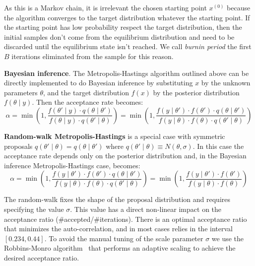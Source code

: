 \documentclass[11pt,fleqn]{book} %
\begin{document}
As this is a Markov chain, it is irrelevant the chosen starting point 
$x^{(0)}$ because the algorithm converges to the target distribution
whatever the starting point. If the starting point has low probability 
respect the target distribution, then the initial samples don't come 
from the equilibrium distribution and need to be discarded until the 
equilibrium state isn't reached. We call \emph{burnin period} the first 
$B$ iterations eliminated from the sample for this reason.

\textbf{Bayesian inference}.
The Metropolis-Hastings algorithm outlined above can be directly implemented 
to do Bayesian inference by substituting $x$ by the unknown parameters 
$\theta$, and the target distribution $f(x)$ by the posterior distribution 
$f(\theta \mid y)$. Then the acceptance rate becomes:
\begin{displaymath}
	\alpha = \min\left(1,\frac{f(\theta' \mid y) \cdot q(\theta \mid \theta')}{f(\theta \mid y) \cdot q(\theta' \mid \theta)}\right) = \min\left(1,\frac{f(y \mid \theta') \cdot f(\theta') \cdot q(\theta \mid \theta')}{f(y \mid \theta)  \cdot f(\theta) \cdot q(\theta' \mid \theta)}\right)
\end{displaymath}

\textbf{Random-walk Metropolis-Hastings} is a special case with symmetric 
proposals $q(\theta' \mid \theta) = q(\theta \mid \theta')$ where 
$q(\theta' \mid \theta) \equiv N(\theta,\sigma)$. 
In this case the acceptance rate depends only on the posterior distribution
and, in the Bayesian inference Metropolis-Hastings case, becomes:
\begin{displaymath}
	\alpha = 
	\min\left(1,\frac{f(y \mid \theta') \cdot f(\theta') \cdot q(\theta \mid \theta')}{f(y \mid \theta)  \cdot f(\theta) \cdot q(\theta' \mid \theta)}\right) = 
	\min\left(1,\frac{f(y \mid \theta') \cdot f(\theta')}{f(y \mid \theta) \cdot f(\theta)}\right)
\end{displaymath}

The random-walk fixes the shape of the proposal distribution and requires 
specifying the value $\sigma$. This value has a direct non-linear impact 
on the acceptance ratio (\#accepted/\#iterations). There is an optimal 
acceptance ratio that minimizes the auto-correlation, and in most cases 
relies in the interval $[0.234,0.44]$. To avoid the  manual tuning of the 
scale parameter $\sigma$ we use the Robbins-Monro algorithm~\cite{garthwaite:2010} 
that performs an adaptive scaling to achieve the desired acceptance ratio.
\end{document}
